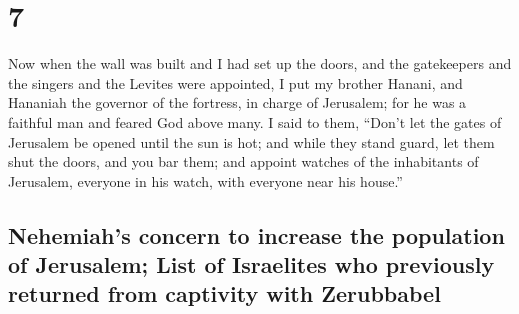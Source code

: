 \hypertarget{section-6}{%
\section{7}\label{section-6}}

 Now when the wall was built and I had set up the doors,
and the gatekeepers and the singers and the Levites were appointed,
 I put my brother Hanani, and Hananiah the governor of the
fortress, in charge of Jerusalem; for he was a faithful man and feared
God above many.  I said to them, ``Don't let the gates of
Jerusalem be opened until the sun is hot; and while they stand guard,
let them shut the doors, and you bar them; and appoint watches of the
inhabitants of Jerusalem, everyone in his watch, with everyone near his
house.''

\hypertarget{nehemiahs-concern-to-increase-the-population-of-jerusalem-list-of-israelites-who-previously-returned-from-captivity-with-zerubbabel}{%
\subsection{Nehemiah's concern to increase the population of Jerusalem;
List of Israelites who previously returned from captivity with
Zerubbabel}\label{nehemiahs-concern-to-increase-the-population-of-jerusalem-list-of-israelites-who-previously-returned-from-captivity-with-zerubbabel}}

